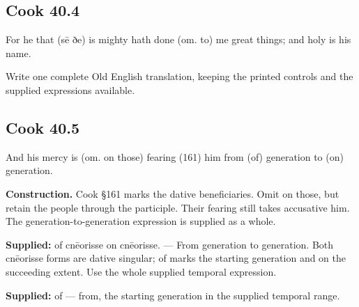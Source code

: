 \par\begin{minipage}{\linewidth}\raggedright
\subsection*{Cook 40.4}

For he that (sē ðe) is mighty hath done (om. to) me great things; and holy is his name.

Write one complete Old English translation, keeping the printed controls and the supplied expressions available.

\end{minipage}\par\addvspace{4pt}

\par\begin{minipage}{\linewidth}\raggedright
\subsection*{Cook 40.5}

And his mercy is (om. on those) fearing (161) him from (of) generation to (on) generation.

\end{minipage}\par\addvspace{4pt}

\textbf{Construction.} Cook §161 marks the dative beneficiaries. Omit on those, but retain the people through the participle. Their fearing still takes accusative him. The generation-to-generation expression is supplied as a whole.

\textbf{Supplied:} of cnēorisse on cnēorisse. — From generation to generation. Both cnēorisse forms are dative singular; of marks the starting generation and on the succeeding extent. Use the whole supplied temporal expression.

\textbf{Supplied:} of — from, the starting generation in the supplied temporal range.

